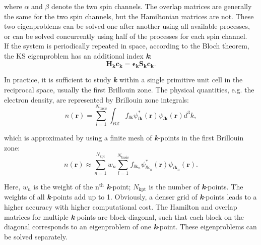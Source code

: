 \documentclass{report}
\begin{document}
\noindent where $\alpha$ and $\beta$ denote the two spin channels.  The overlap matrices are generally the same for the two spin channels, but the Hamiltonian matrices are not.  These two eigenproblems can be solved one after another using all available processes, or can be solved concurrently using half of the processes for each spin channel.\\

If the system is periodically repeated in space, according to the Bloch theorem, the KS eigenproblem has an additional index \textbf{\textit{k}}:\\
\begin{equation}
\label{eq:kpt_evp}
\boldsymbol{H}_{\boldsymbol{k}} \boldsymbol{c}_{\boldsymbol{k}} = \boldsymbol{\epsilon}_{\boldsymbol{k}} \boldsymbol{S}_{\boldsymbol{k}} \boldsymbol{c}_{\boldsymbol{k}} .
\end{equation}

\noindent In practice, it is sufficient to study \textbf{\textit{k}} within a single primitive unit cell in the reciprocal space, usually the first Brillouin zone.  The physical quantities, e.g. the electron density, are represented by Brillouin zone integrals:\\
\begin{equation}
\label{eq:bz}
n (\boldsymbol{r}) = \sum_{l=1}^{N_\text{basis}} \int_{BZ} f_{l \boldsymbol{k}} \psi_{l \boldsymbol{k}}^* (\boldsymbol{r}) \psi_{l \boldsymbol{k}} (\boldsymbol{r}) d^3 k ,
\end{equation}

\noindent which is approximated by using a finite mesh of \textbf{\textit{k}}-points in the first Brillouin zone:\\
\begin{equation}
\label{eq:k_grid}
n (\boldsymbol{r}) \approx \sum_{n=1}^{N_\text{kpt}} w_n
\sum_{l=1}^{N_\text{basis}} f_{l \boldsymbol{k}_n} \psi_{l \boldsymbol{k}_n}^* (\boldsymbol{r}) \psi_{l \boldsymbol{k}_n} (\boldsymbol{r}) .
\end{equation}

\noindent Here, $w_n$ is the weight of the n$^\text{th}$ \textbf{\textit{k}}-point; $N_\text{kpt}$ is the number of \textbf{\textit{k}}-points.  The weights of all \textbf{\textit{k}}-points add up to 1.  Obviously, a denser grid of \textbf{\textit{k}}-points leads to a higher accuracy with higher computational cost.  The Hamilton and overlap matrices for multiple \textbf{\textit{k}}-points are block-diagonal, such that each block on the diagonal corresponds to an eigenproblem of one \textbf{\textit{k}}-point.  These eigenproblems can be solved separately.\\
\end{document}
